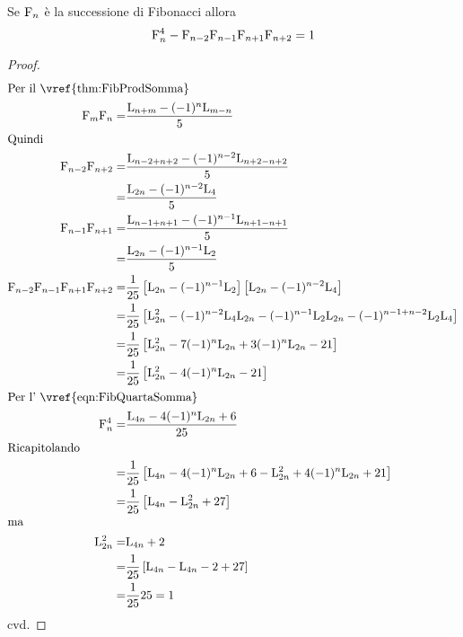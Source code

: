 \begin{thm}\label{thm:FibGelinCesaro}
	Se $\mathrm{F}_{n}$ è la successione di Fibonacci allora 
	\begin{equation}
	\mathrm{F}_{n}^4-\mathrm{F}_{n-2}\mathrm{F}_{n-1}\mathrm{F}_{n+1}\mathrm{F}_{n+2}=1
	\end{equation}\label{eqn:FibGelinCesaro}
\end{thm}
\begin{proof}
\begin{align*}
		\intertext{Per il~\vref{thm:FibProdSomma}}
	\Fib{m}\Fib{n}=&{}\dfrac{\Luc{n+m}-(-1)^n\Luc{m-n}}{5}\\
	\intertext{Quindi}
	\Fib{n-2}\Fib{n+2}=&{}\dfrac{\Luc{n-2+n+2}-(-1)^{n-2}\Luc{n+2-n+2}}{5}\\
=&{}\dfrac{\Luc{2n}-(-1)^{n-2}\Luc{4}}{5}\\
	\Fib{n-1}\Fib{n+1}=&{}\dfrac{\Luc{n-1+n+1}-(-1)^{n-1}\Luc{n+1-n+1}}{5}\\
=&{}\dfrac{\Luc{2n}-(-1)^{n-1}\Luc{2}}{5}\\
	\Fib{n-2}\Fib{n-1}\Fib{n+1}\Fib{n+2}
=&{}\dfrac{1}{25}\left[\Luc{2n}-(-1)^{n-1}\Luc{2}\right]\left[\Luc{2n}-(-1)^{n-2}\Luc{4}\right]\\
=&{}\dfrac{1}{25}\left[\Luc{2n}^2-(-1)^{n-2}\Luc{4}\Luc{2n}-(-1)^{n-1}\Luc{2}\Luc{2n}-(-1)^{n-1+n-2}\Luc{2}\Luc{4}\right]\\
=&{}\dfrac{1}{25}\left[\Luc{2n}^2-7(-1)^{n}\Luc{2n}+3(-1)^{n}\Luc{2n}-21\right]\\
=&{}\dfrac{1}{25}\left[\Luc{2n}^2-4(-1)^{n}\Luc{2n}-21\right]\\
	\intertext{Per l'~\vref{eqn:FibQuartaSomma}}
	\Fib{n}^4=&{}\dfrac{\Luc{4n}-4(-1)^n\Luc{2n}+6}{25}\\
	\intertext{Ricapitolando}
=&{}\dfrac{1}{25}\left[\Luc{4n}-4(-1)^n\Luc{2n}+6-\Luc{2n}^2+4(-1)^{n}\Luc{2n}+21\right]\\
=&{}\dfrac{1}{25}\left[\Luc{4n}-\Luc{2n}^2+27\right]\\
	\intertext{ma}
	\Luc{2n}^2=&\Luc{4n}+2\\
=&{}\dfrac{1}{25}\left[\Luc{4n}-\Luc{4n}-2+27\right]\\
=&{}\dfrac{1}{25}25=1\\
\end{align*}
cvd.
\end{proof}
